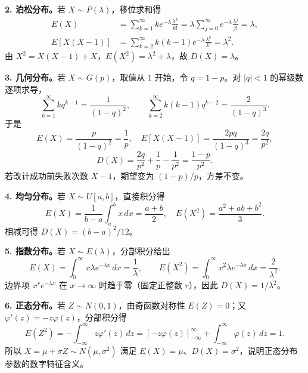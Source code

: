 \documentclass[UTF8,fontset=none,zihao=-4,a4paper]{ctexart}
\begin{document}
\textbf{2. 泊松分布。}若 $X\sim P(\lambda)$，移位求和得
\begin{align*}
E(X)&=\sum_{k=1}^{\infty}k e^{-\lambda}\frac{\lambda^k}{k!}
=\lambda\sum_{j=0}^{\infty}e^{-\lambda}\frac{\lambda^j}{j!}=\lambda,\\
E[X(X-1)]&=\sum_{k=2}^{\infty}k(k-1)e^{-\lambda}\frac{\lambda^k}{k!}=\lambda^2.
\end{align*}
由 $X^2=X(X-1)+X$，$E(X^2)=\lambda^2+\lambda$，故 $D(X)=\lambda$。

\textbf{3. 几何分布。}若 $X\sim G(p)$，取值从 $1$ 开始，令 $q=1-p$。对 $|q|<1$ 的幂级数逐项求导，
\[
\sum_{k=1}^{\infty}kq^{k-1}=\frac1{(1-q)^2},\qquad
\sum_{k=2}^{\infty}k(k-1)q^{k-2}=\frac2{(1-q)^3}.
\]
于是
\[
E(X)=\frac p{(1-q)^2}=\frac1p,\quad
E[X(X-1)]=\frac{2pq}{(1-q)^3}=\frac{2q}{p^2},
\]
\[
D(X)=\frac{2q}{p^2}+\frac1p-\frac1{p^2}=\frac{1-p}{p^2}.
\]
若改计成功前失败次数 $X-1$，期望变为 $(1-p)/p$，方差不变。

\textbf{4. 均匀分布。}若 $X\sim U[a,b]$，直接积分得
\[
E(X)=\frac1{b-a}\int_a^b x\,dx=\frac{a+b}{2},\quad
E(X^2)=\frac{a^2+ab+b^2}{3}.
\]
相减可得 $D(X)=(b-a)^2/12$。

\textbf{5. 指数分布。}若 $X\sim E(\lambda)$，分部积分给出
\[
E(X)=\int_0^{\infty}x\lambda e^{-\lambda x}\,dx=\frac1\lambda,\qquad
E(X^2)=\int_0^{\infty}x^2\lambda e^{-\lambda x}\,dx=\frac2{\lambda^2}.
\]
边界项 $x^re^{-\lambda x}$ 在 $x\to\infty$ 时趋于零（固定正整数 $r$），因此 $D(X)=1/\lambda^2$。

\textbf{6. 正态分布。}若 $Z\sim N(0,1)$，由奇函数对称性 $E(Z)=0$；又 $\varphi'(z)=-z\varphi(z)$，分部积分得
\[
E(Z^2)=-\int_{-\infty}^{\infty}z\varphi'(z)\,dz
=[-z\varphi(z)]_{-\infty}^{\infty}+\int_{-\infty}^{\infty}\varphi(z)\,dz=1.
\]
所以 $X=\mu+\sigma Z\sim N(\mu,\sigma^2)$ 满足 $E(X)=\mu$、$D(X)=\sigma^2$，说明正态分布参数的数字特征含义。

\end{document}

